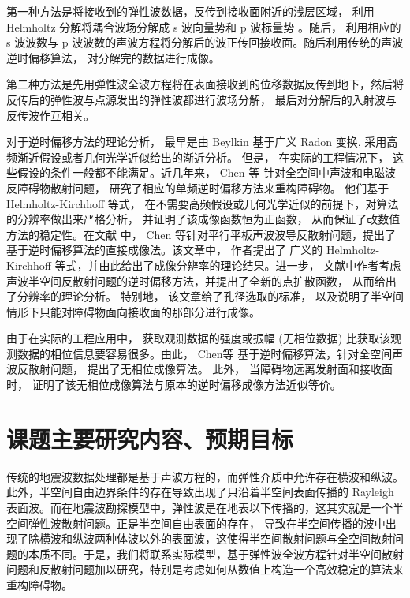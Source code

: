 第一种方法是将接收到的弹性波数据，反传到接收面附近的浅层区域， 利用 Helmholtz 分解将耦合波场分解成 s 波向量势和 p 波标量势 \cite{etgen1988prestacked,zhe1997prestack}。随后， 利用相应的 s 波波数与 p 波波数的声波方程将分解后的波正传回接收面。随后利用传统的声波逆时偏移算法， 对分解完的数据进行成像。

第二种方法是先用弹性波全波方程将在表面接收到的位移数据反传到地下，然后将反传后的弹性波与点源发出的弹性波都进行波场分解， 最后对分解后的入射波与反传波作互相关\cite{dellinger1990wave}。

对于逆时偏移方法的理论分析， 最早是由 Beylkin \cite{beylkin1984inversion,beylkin1985imaging,beylkin1990linearized} 基于广义 Radon 变换, 采用高
频渐近假设或者几何光学近似给出的渐近分析。 但是， 在实际的工程情况下， 这些假设的条件一般都不能满足。近几年来， Chen 等\cite{chen2013reverse_acou,chen2013reverse_elec,thesis_guanghui} 针对全空间中声波和电磁波反障碍物散射问题， 研究了相应的单频逆时偏移方法来重构障碍物。 他们基于  Helmholtz-Kirchhoff 等式， 在不需要高频假设或几何光学近似的前提下，对算法的分辨率做出来严格分析， 并证明了该成像函数恒为正函数， 从而保证了改数值方法的稳定性。在文献 \cite{chen2015reverse_planar} 中， Chen 等针对平行平板声波波导反散射问题，提出了基于逆时偏移算法的直接成像法。该文章中， 作者提出了 广义的 Helmholtz-Kirchhoff 等式，并由此给出了成像分辨率的理论结果。进一步， 文献\cite{RTMhalf_aco}中作者考虑声波半空间反散射问题的逆时偏移方法，并提出了全新的点扩散函数， 从而给出了分辨率的理论分析。 特别地， 该文章给了孔径选取的标准， 以及说明了半空间情形下只能对障碍物面向接收面的那部分进行成像。

由于在实际的工程应用中， 获取观测数据的强度或振幅 (无相位数据) 比获取该观测数据的相位信息要容易很多。由此， Chen等 \cite{chen2016direct} 基于逆时偏移算法，针对全空间声波反散射问题， 提出了无相位成像算法。 此外， 当障碍物远离发射面和接收面时， 证明了该无相位成像算法与原本的逆时偏移成像方法近似等价。



\section{课题主要研究内容、预期目标}
 传统的地震波数据处理都是基于声波方程的，而弹性介质中允许存在横波和纵波。此外，半空间自由边界条件的存在导致出现了只沿着半空间表面传播的 Rayleigh 表面波。而在地震波勘探模型中，弹性波是在地表以下传播的，这其实就是一个半空间弹性波散射问题。正是半空间自由表面的存在， 导致在半空间传播的波中出现了除横波和纵波两种体波以外的表面波，这使得半空间散射问题与全空间散射问题的本质不同。于是，我们将联系实际模型，基于弹性波全波方程针对半空间散射问题和反散射问题加以研究，特别是考虑如何从数值上构造一个高效稳定的算法来重构障碍物。

